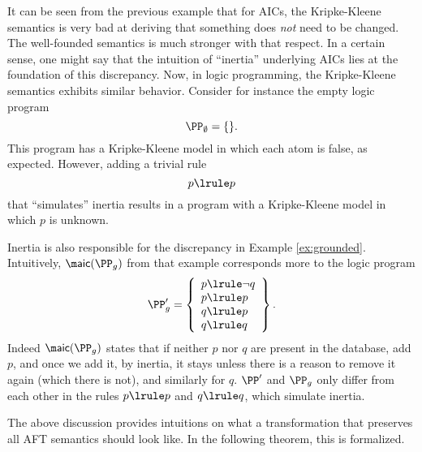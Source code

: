 It can be seen from the previous example that for AICs, the Kripke-Kleene semantics is very bad at deriving that something does \emph{not} need to be changed. The well-founded semantics is much stronger with that respect. 
In a certain sense, one might say that the intuition of ``inertia'' underlying AICs lies at the foundation of this discrepancy. 
Now, in logic programming, the Kripke-Kleene semantics exhibits similar behavior. Consider for instance the empty logic program 
\[ \PP_\emptyset = \{ \}.\]
This program has a Kripke-Kleene model in which each atom is false, as expected. 
However, adding a trivial rule
\[p\lrule p\]
 that ``simulates'' inertia results in a program with a Kripke-Kleene model in which $p$ is unknown.
 
 Inertia is also responsible for the discrepancy in Example \ref{ex:grounded}. 
 Intuitively, $\aicop(\PP_g)$ from that example corresponds more to the logic program
  \[\PP_g' = \left\{\begin{array}{l}p\lrule \lnot q \\ p\lrule p \\ q\lrule p\\ q\lrule q  \end{array}\right\}.\]
  Indeed $\aicop(\PP_g)$ states that if neither  $p$ nor $q$ are present in the database, add $p$, and once we add it, by inertia, it stays unless there is a reason to remove it again (which there is not), and similarly for $q$. 
  $\PP'$ and $\PP_g$ only differ from each other in the rules $p\lrule p$ and $q\lrule q$, which simulate inertia.
 
 
 The above discussion provides intuitions on what a transformation that preserves all AFT semantics should look like. In the following theorem, this is formalized. 

  


